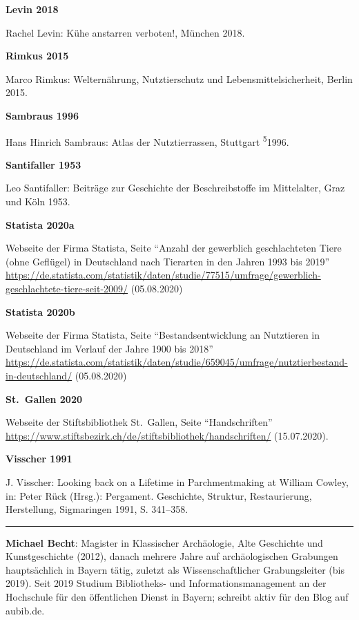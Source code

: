 \documentclass[a4paper,
fontsize=11pt,
oneside,
numbers=noperiodatend,
parskip=half-,
bibliography=totoc,
final
]{scrartcl}
\begin{document}
\textbf{Levin 2018}

Rachel Levin: Kühe anstarren verboten!, München 2018.

\textbf{Rimkus 2015}

Marco Rimkus: Welternährung, Nutztierschutz und Lebensmittelsicherheit,
Berlin 2015.

\textbf{Sambraus 1996}

Hans Hinrich Sambraus: Atlas der Nutztierrassen, Stuttgart
\textsuperscript{5}1996.

\textbf{Santifaller 1953}

Leo Santifaller: Beiträge zur Geschichte der Beschreibstoffe im
Mittelalter, Graz und Köln 1953.

\textbf{Statista 2020a}

Webseite der Firma Statista, Seite \enquote{Anzahl der gewerblich
geschlachteten Tiere (ohne Geflügel) in Deutschland nach Tierarten in
den Jahren 1993 bis 2019}
\url{https://de.statista.com/statistik/daten/studie/77515/umfrage/gewerblich-geschlachtete-tiere-seit-2009/}
(05.08.2020)

\textbf{Statista 2020b}

Webseite der Firma Statista, Seite \enquote{Bestandsentwicklung an
Nutztieren in Deutschland im Verlauf der Jahre 1900 bis 2018}
\url{https://de.statista.com/statistik/daten/studie/659045/umfrage/nutztierbestand-in-deutschland/}
(05.08.2020)

\textbf{St.~Gallen 2020}

Webseite der Stiftsbibliothek St.~Gallen, Seite \enquote{Handschriften}
\url{https://www.stiftsbezirk.ch/de/stiftsbibliothek/handschriften/}
(15.07.2020).

\textbf{Visscher 1991}

J. Visscher: Looking back on a Lifetime in Parchmentmaking at William
Cowley, in: Peter Rück (Hrsg.): Pergament. Geschichte, Struktur,
Restaurierung, Herstellung, Sigmaringen 1991, S. 341--358.

\begin{center}\rule{0.5\linewidth}{0.5pt}\end{center}

\textbf{Michael Becht}: Magister in Klassischer Archäologie, Alte
Geschichte und Kunstgeschichte (2012), danach mehrere Jahre auf
archäologischen Grabungen hauptsächlich in Bayern tätig, zuletzt als
Wissenschaftlicher Grabungsleiter (bis 2019). Seit 2019 Studium
Bibliotheks- und Informationsmanagement an der Hochschule für den
öffentlichen Dienst in Bayern; schreibt aktiv für den Blog auf aubib.de.
\end{document}
